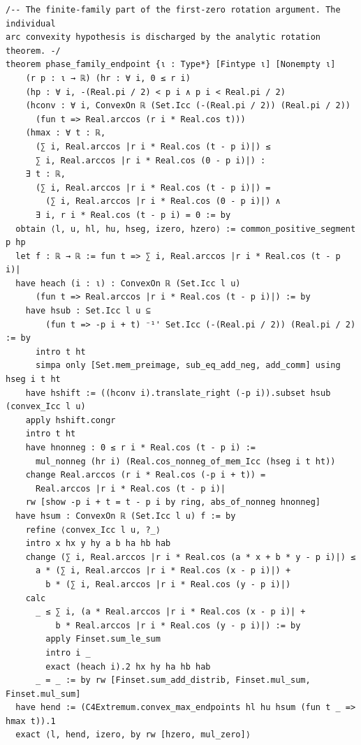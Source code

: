 \documentclass[11pt,a4paper]{article}
\begin{document}
\begin{Verbatim}[breaklines,breakanywhere,fontsize=\footnotesize]
/-- The finite-family part of the first-zero rotation argument. The individual
arc convexity hypothesis is discharged by the analytic rotation theorem. -/
theorem phase_family_endpoint {ι : Type*} [Fintype ι] [Nonempty ι]
    (r p : ι → ℝ) (hr : ∀ i, 0 ≤ r i)
    (hp : ∀ i, -(Real.pi / 2) < p i ∧ p i < Real.pi / 2)
    (hconv : ∀ i, ConvexOn ℝ (Set.Icc (-(Real.pi / 2)) (Real.pi / 2))
      (fun t => Real.arccos (r i * Real.cos t)))
    (hmax : ∀ t : ℝ,
      (∑ i, Real.arccos |r i * Real.cos (t - p i)|) ≤
      ∑ i, Real.arccos |r i * Real.cos (0 - p i)|) :
    ∃ t : ℝ,
      (∑ i, Real.arccos |r i * Real.cos (t - p i)|) =
        (∑ i, Real.arccos |r i * Real.cos (0 - p i)|) ∧
      ∃ i, r i * Real.cos (t - p i) = 0 := by
  obtain ⟨l, u, hl, hu, hseg, izero, hzero⟩ := common_positive_segment p hp
  let f : ℝ → ℝ := fun t => ∑ i, Real.arccos |r i * Real.cos (t - p i)|
  have heach (i : ι) : ConvexOn ℝ (Set.Icc l u)
      (fun t => Real.arccos |r i * Real.cos (t - p i)|) := by
    have hsub : Set.Icc l u ⊆
        (fun t => -p i + t) ⁻¹' Set.Icc (-(Real.pi / 2)) (Real.pi / 2) := by
      intro t ht
      simpa only [Set.mem_preimage, sub_eq_add_neg, add_comm] using hseg i t ht
    have hshift := ((hconv i).translate_right (-p i)).subset hsub (convex_Icc l u)
    apply hshift.congr
    intro t ht
    have hnonneg : 0 ≤ r i * Real.cos (t - p i) :=
      mul_nonneg (hr i) (Real.cos_nonneg_of_mem_Icc (hseg i t ht))
    change Real.arccos (r i * Real.cos (-p i + t)) =
      Real.arccos |r i * Real.cos (t - p i)|
    rw [show -p i + t = t - p i by ring, abs_of_nonneg hnonneg]
  have hsum : ConvexOn ℝ (Set.Icc l u) f := by
    refine ⟨convex_Icc l u, ?_⟩
    intro x hx y hy a b ha hb hab
    change (∑ i, Real.arccos |r i * Real.cos (a * x + b * y - p i)|) ≤
      a * (∑ i, Real.arccos |r i * Real.cos (x - p i)|) +
        b * (∑ i, Real.arccos |r i * Real.cos (y - p i)|)
    calc
      _ ≤ ∑ i, (a * Real.arccos |r i * Real.cos (x - p i)| +
          b * Real.arccos |r i * Real.cos (y - p i)|) := by
        apply Finset.sum_le_sum
        intro i _
        exact (heach i).2 hx hy ha hb hab
      _ = _ := by rw [Finset.sum_add_distrib, Finset.mul_sum, Finset.mul_sum]
  have hend := (C4Extremum.convex_max_endpoints hl hu hsum (fun t _ => hmax t)).1
  exact ⟨l, hend, izero, by rw [hzero, mul_zero]⟩


\end{Verbatim}
\end{document}
